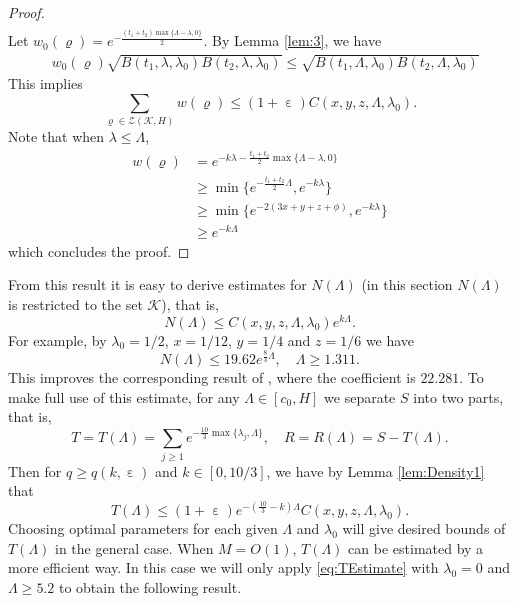 \documentclass[10pt, reqno]{amsart}
\numberwithin{equation}{section}
\renewcommand{\epsilon }{\operatorname{\varepsilon}}
\renewcommand{\rho }{\operatorname{\varrho}}
\begin{document}
\begin{proof}
\begin{equation}
\begin{split}
\end{split}
\end{equation}
Let $w_0(\rho)=e^{-\frac{(t_1+t_2)\max\{\Lambda-\lambda,0\}}{2}}$. By Lemma \ref{lem:3}, we have
\begin{equation}\label{eq:w0Bound}
\begin{split}
&w_0(\rho) \sqrt{B(t_1,\lambda,\lambda_0)B(t_2,\lambda,\lambda_0)}\leq \sqrt{B(t_1,\Lambda,\lambda_0)B(t_2,\Lambda,\lambda_0)}
\end{split}
\end{equation}
This implies
\begin{equation}\label{eq:FinalBound}
\sum_{\rho \in \mathcal{Z}(\mathcal{K},H)}w(\rho)\leq (1+\epsilon)C(x,y,z,\Lambda,\lambda_0).
\end{equation}
Note that when $\lambda\leq \Lambda$,
\begin{equation}\label{eq:wLower}
\begin{split}
w(\rho)&=e^{-k\lambda -\frac{t_1+t_2}{2}\max\{\Lambda-\lambda,0\}} \\
&\geq \min \{ e^{-\frac{t_1+t_2}{2}\Lambda}, e^{-k\lambda} \} \\
&\geq \min \{ e^{-2(3x+y+z+\phi)}, e^{-k\lambda} \} \\
&\geq e^{-k\Lambda}
\end{split}
\end{equation}
which concludes the proof.
\end{proof}

From this result it is easy to derive estimates for $N(\Lambda)$ (in this section $N(\Lambda)$ is restricted to the set $\mathcal{K}$), that is,
\begin{equation}\label{eq:NEstimate}
N(\Lambda)\leq C(x,y,z,\Lambda,\lambda_0) e^{k\Lambda}.
\end{equation}
For example, by $\lambda_0=1/2$, $x=1/12$, $y=1/4$ and $z=1/6$ we have
\begin{equation}\label{eq:Example}
N(\Lambda)\leq 19.62e^{\frac{8}{3}\Lambda},\quad \Lambda\geq 1.311.
\end{equation}
This improves the corresponding result of \cite{Pintz2018}, where the coefficient is $22.281$. To make full use of this estimate, for any $\Lambda\in [c_0,H]$ we separate $S$ into two parts, that is,
\begin{equation}\label{eq:TandR}
T=T(\Lambda)=\sum_{j\geq 1} e^{-\frac{10}{3} \max \{\lambda_{j},\Lambda\}},\quad R=R(\Lambda)=S-T(\Lambda).
\end{equation}
Then for $q\geq q(k,\epsilon)$ and $k\in [0,10/3]$, we have by Lemma \ref{lem:Density1} that
\begin{equation}\label{eq:TEstimate}
T(\Lambda)\leq (1+\epsilon)e^{-(\frac{10}{3}-k)\Lambda} C(x,y,z,\Lambda,\lambda_0).
\end{equation}
Choosing optimal parameters for each given $\Lambda$ and $\lambda_0$ will give desired bounds of $T(\Lambda)$ in the general case.  When $M=O(1)$, $T(\Lambda)$ can be estimated by a more efficient way. In this case we will only apply \eqref{eq:TEstimate} with $\lambda_0=0$ and $\Lambda\geq 5.2$ to obtain the following result.
\end{document}
